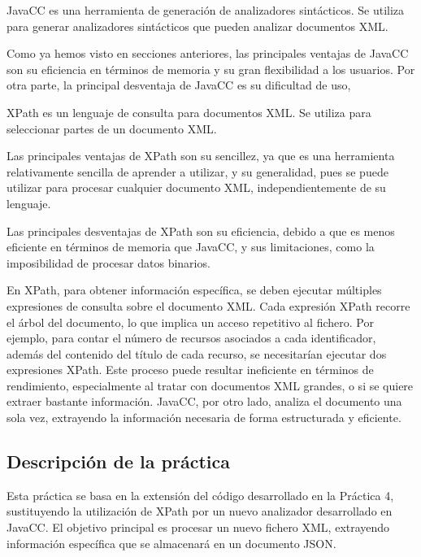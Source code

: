 JavaCC es una herramienta de generación de analizadores sintácticos. Se utiliza para generar analizadores sintácticos que pueden analizar documentos XML.

Como ya hemos visto en secciones anteriores, las principales ventajas de JavaCC son su eficiencia en términos de memoria y su gran flexibilidad a los usuarios. Por otra parte, la principal desventaja de JavaCC es su dificultad de uso,

XPath es un lenguaje de consulta para documentos XML. Se utiliza para seleccionar partes de un documento XML.

Las principales ventajas de XPath son su sencillez, ya que es una herramienta relativamente sencilla de aprender a utilizar, y su generalidad, pues se puede utilizar para procesar cualquier documento XML, independientemente de su lenguaje.

Las principales desventajas de XPath son su eficiencia, debido a que es menos eficiente en términos de memoria que JavaCC, y sus limitaciones, como la imposibilidad de procesar datos binarios.


En XPath, para obtener información específica, se deben ejecutar múltiples expresiones de consulta sobre el documento XML. Cada expresión XPath recorre el árbol del documento, lo que implica un acceso repetitivo al fichero. Por ejemplo, para contar el número de recursos asociados a cada identificador, además del contenido del título de cada recurso, se necesitarían ejecutar dos expresiones XPath. Este proceso puede resultar ineficiente en términos de rendimiento, especialmente al tratar con documentos XML grandes, o si se quiere extraer bastante información. JavaCC, por otro lado, analiza el documento una sola vez, extrayendo la información necesaria de forma estructurada y eficiente.

\subsection{Descripción de la práctica}

\noindent Esta práctica se basa en la extensión del código desarrollado en la Práctica 4, sustituyendo la utilización de XPath por un nuevo analizador desarrollado en JavaCC. El objetivo principal es procesar un nuevo fichero XML, extrayendo información específica que se almacenará en un documento JSON.

